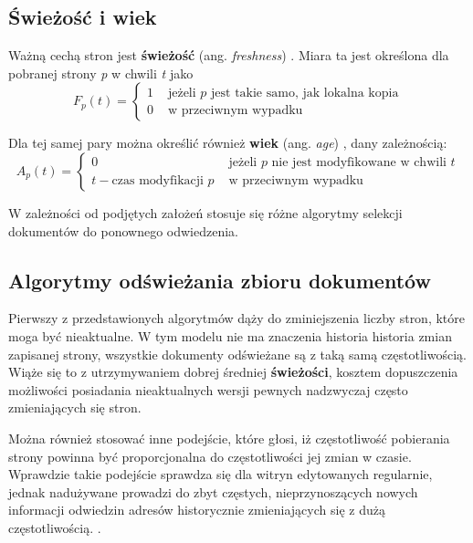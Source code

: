 \subsection{Świeżość i wiek}
\label{subsec:swiezoscWiek}
Ważną cechą stron jest \textbf{świeżość} (ang. \emph{freshness}) \cite{webMining,webCrawling}. Miara ta jest określona dla pobranej strony \emph{p} w chwili \emph{t} jako
    \begin{equation}
        F_p(t) = 
        \begin{cases}
            1 &\text{  jeżeli } p\text{ jest takie samo, jak lokalna kopia}\\
            0 &\text{ w przeciwnym wypadku}
        \end{cases}
    \end{equation}

Dla tej samej pary można określić również \textbf{wiek} (ang. \emph{age}) \cite{webCrawling}, dany zależnością:
\begin{equation}
        A_p(t) = 
        \begin{cases}
            0 &\text{  jeżeli } p\text{ nie jest modyfikowane w chwili }t\\
            t - \text{czas modyfikacji } p &\text{ w przeciwnym wypadku}
        \end{cases}
    \end{equation}
    
W zależności od podjętych założeń stosuje się różne algorytmy selekcji dokumentów do ponownego odwiedzenia.



\subsection{Algorytmy odświeżania zbioru dokumentów}
\label{sec:odswStron}

Pierwszy z przedstawionych algorytmów dąży do zminiejszenia liczby stron, które moga być nieaktualne. W tym modelu nie ma znaczenia historia historia
zmian zapisanej strony, wszystkie dokumenty odświeżane są z taką samą częstotliwością. Wiąże się to z utrzymywaniem dobrej średniej \textbf{świeżości},
\cite{freshAge} kosztem dopuszczenia możliwości posiadania nieaktualnych wersji pewnych nadzwyczaj często zmieniających się stron. 

Można również stosować inne podejście, które głosi, iż częstotliwość pobierania strony powinna być proporcjonalna do częstotliwości jej zmian w czasie.
Wprawdzie takie podejście sprawdza się dla witryn edytowanych regularnie, jednak nadużywane prowadzi do zbyt częstych, nieprzynoszących nowych informacji
odwiedzin adresów historycznie zmieniających się z dużą częstotliwością. \cite{freshAge}.

